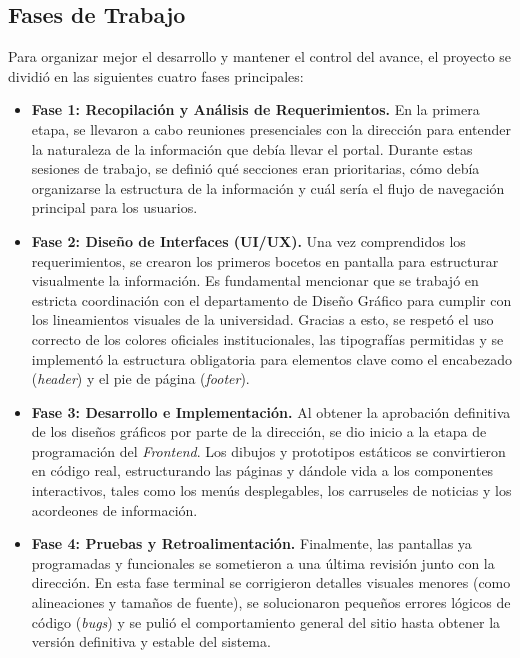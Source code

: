 \subsection{Fases de Trabajo}
Para organizar mejor el desarrollo y mantener el control del avance, el proyecto se dividió en las siguientes cuatro fases principales:

\begin{itemize}
    \item \textbf{Fase 1: Recopilación y Análisis de Requerimientos.} En la primera etapa, se llevaron a cabo reuniones presenciales con la dirección para entender la naturaleza de la información que debía llevar el portal. Durante estas sesiones de trabajo, se definió qué secciones eran prioritarias, cómo debía organizarse la estructura de la información y cuál sería el flujo de navegación principal para los usuarios.
    
    \item \textbf{Fase 2: Diseño de Interfaces (UI/UX).} Una vez comprendidos los requerimientos, se crearon los primeros bocetos en pantalla para estructurar visualmente la información. Es fundamental mencionar que se trabajó en estricta coordinación con el departamento de Diseño Gráfico para cumplir con los lineamientos visuales de la universidad. Gracias a esto, se respetó el uso correcto de los colores oficiales institucionales, las tipografías permitidas y se implementó la estructura obligatoria para elementos clave como el encabezado (\textit{header}) y el pie de página (\textit{footer}).
    
    \item \textbf{Fase 3: Desarrollo e Implementación.} Al obtener la aprobación definitiva de los diseños gráficos por parte de la dirección, se dio inicio a la etapa de programación del \textit{Frontend}. Los dibujos y prototipos estáticos se convirtieron en código real, estructurando las páginas y dándole vida a los componentes interactivos, tales como los menús desplegables, los carruseles de noticias y los acordeones de información.
    
    \item \textbf{Fase 4: Pruebas y Retroalimentación.} Finalmente, las pantallas ya programadas y funcionales se sometieron a una última revisión junto con la dirección. En esta fase terminal se corrigieron detalles visuales menores (como alineaciones y tamaños de fuente), se solucionaron pequeños errores lógicos de código (\textit{bugs}) y se pulió el comportamiento general del sitio hasta obtener la versión definitiva y estable del sistema.
\end{itemize}

